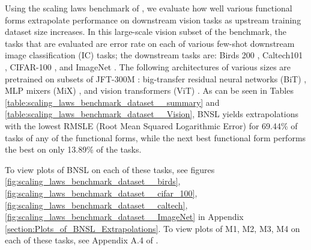 \documentclass{article} %
\begin{document}

Using the scaling laws benchmark of \cite{Alabdulmohsi2022revisiting}, we evaluate how well various functional forms extrapolate performance on downstream vision tasks as upstream training dataset size increases. In this large-scale vision subset of the benchmark, the tasks that are evaluated are error rate on each of various few-shot downstream image classification (IC) tasks; the downstream tasks are: Birds 200 \citep{welinder2010caltech}, Caltech101 \citep{fei2004learning}, CIFAR-100 \citep{krizhevsky2009learning}, and ImageNet \citep{deng2009imagenet}. The following architectures of various sizes are pretrained on subsets of JFT-300M \citep{sun2017revisiting}: big-transfer residual neural networks (BiT) \citep{kolesnikov2020big}, MLP mixers (MiX) \citep{tolstikhin2021mlp}, and vision transformers (ViT) \citep{dosovitskiy2020image}. As can be seen in Tables  \ref{table:scaling_laws_benchmark_dataset__summary} and \ref{table:scaling_laws_benchmark_dataset__Vision}, BNSL yields extrapolations with the lowest RMSLE (Root Mean Squared Logarithmic Error) for 69.44\% of tasks of any of the functional forms, while the next best functional form performs the best on only 13.89\% of the tasks.

\vspace{-2.0mm}

To view plots of BNSL on each of these tasks, see figures
\ref{fig:scaling_laws_benchmark_dataset__birds},
\ref{fig:scaling_laws_benchmark_dataset__cifar_100},
\ref{fig:scaling_laws_benchmark_dataset__caltech},
\ref{fig:scaling_laws_benchmark_dataset__ImageNet} in Appendix \ref{section:Plots_of_BNSL_Extrapolations}. To view plots of M1, M2, M3, M4 on each of these tasks, see Appendix A.4 of \cite{Alabdulmohsi2022revisiting}.
\end{document}
